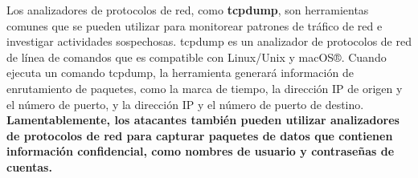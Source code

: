 Los analizadores de protocolos de red, como \textbf{tcpdump}, son herramientas comunes que se pueden utilizar para monitorear patrones de tráfico de red e investigar actividades sospechosas. tcpdump es un analizador de protocolos de red de línea de comandos que es compatible con Linux/Unix y macOS®. Cuando ejecuta un comando tcpdump, la herramienta generará información de enrutamiento de paquetes, como la marca de tiempo, la dirección IP de origen y el número de puerto, y la dirección IP y el número de puerto de destino. \textbf{Lamentablemente, los atacantes también pueden utilizar analizadores de protocolos de red para capturar paquetes de datos que contienen información confidencial, como nombres de usuario y contraseñas de cuentas.}